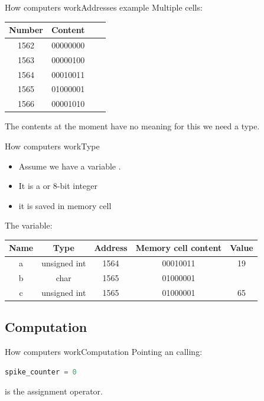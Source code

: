 \documentclass[aspectratio=169]{beamer}
\begin{document}
\begin{frame}{How computers work}{Addresses example}
Multiple cells:
\begin{tabular}{cccc}
	\toprule
	Number & Content  \\
	\midrule
	1562   & 00000000 \\
	1563   & 00000100 \\
	1564   & 00010011 \\
	1565   & 01000001 \\
	1566   & 00001010 \\
	\bottomrule
\end{tabular}

\pause
\vspace{2em}

The contents at the moment have no meaning for this we need a type.

\end{frame}

\begin{frame}{How computers work}{Type}

\begin{itemize}
	\item Assume we have a variable .
	\item It is a  or 8-bit integer
	\item it is saved in memory cell 
\end{itemize}

\pause
\vspace{2em}

The variable:
\begin{tabular}{ccccc}
	\toprule
	Name & Type          & Address  & Memory cell content & Value         \\
	\midrule
	a    & unsigned int  & 1564     &  00010011           & 19            \\
	b    &          char & 1565     &  01000001           & \textquote{A} \\
	c    & unsigned int  & 1565     &  01000001           & 65            \\
	\bottomrule
\end{tabular}
\end{frame}

\subsection{Computation}
\begin{frame}[fragile]{How computers work}{Computation}
Pointing an calling:
\vspace{2em}

\begin{lstlisting}[language=Python, frame=single]
spike_counter = 0
\end{lstlisting}

\pause
\vspace{2em}
\pause

\vspace{2em}
\textquote{=} is the assignment operator.
\end{frame}
\end{document}
